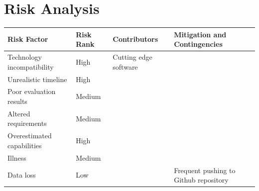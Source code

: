 \section{Risk Analysis}


\begin{center}
    \begin{tabular}{ | l | l | l | p{5cm} |}
    \hline
    Risk Factor & Risk Rank & Contributors & Mitigation and Contingencies \\ \hline
    Technology incompatibility & High & Cutting edge software & \\ \hline 
    Unrealistic timeline & High & & \\ \hline
    Poor evaluation results & Medium & & \\ \hline
    Altered requirements & Medium & & \\ \hline
    Overestimated capabilities & High & & \\ \hline
    Illness & Medium & & \\ \hline 
    Data loss & Low &  & Frequent pushing to Github repository\\ \hline 

   
    \hline
    \end{tabular}
\end{center}





